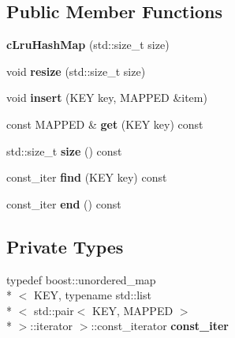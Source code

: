 \subsection*{Public Member Functions}
\begin{DoxyCompactItemize}
\item 
\hypertarget{classresultsDB_1_1cLruHashMap_a529a79f7a33b289760db7771e368aca3}{{\bfseries c\-Lru\-Hash\-Map} (std\-::size\-\_\-t size)}\label{classresultsDB_1_1cLruHashMap_a529a79f7a33b289760db7771e368aca3}

\item 
\hypertarget{classresultsDB_1_1cLruHashMap_a3936bc57867e3eef937226df4c45752e}{void {\bfseries resize} (std\-::size\-\_\-t size)}\label{classresultsDB_1_1cLruHashMap_a3936bc57867e3eef937226df4c45752e}

\item 
\hypertarget{classresultsDB_1_1cLruHashMap_af251ed1c01101b439f637e1ebd0a9113}{void {\bfseries insert} (K\-E\-Y key, M\-A\-P\-P\-E\-D \&item)}\label{classresultsDB_1_1cLruHashMap_af251ed1c01101b439f637e1ebd0a9113}

\item 
\hypertarget{classresultsDB_1_1cLruHashMap_a2f7d334ea70e8ea5de3ad5aa7416bd4a}{const M\-A\-P\-P\-E\-D \& {\bfseries get} (K\-E\-Y key) const }\label{classresultsDB_1_1cLruHashMap_a2f7d334ea70e8ea5de3ad5aa7416bd4a}

\item 
\hypertarget{classresultsDB_1_1cLruHashMap_acf89071b5fd13acbde66a9644c661c59}{std\-::size\-\_\-t {\bfseries size} () const }\label{classresultsDB_1_1cLruHashMap_acf89071b5fd13acbde66a9644c661c59}

\item 
\hypertarget{classresultsDB_1_1cLruHashMap_a5f1cad81321c5af7ba5fbcebcf40de46}{const\-\_\-iter {\bfseries find} (K\-E\-Y key) const }\label{classresultsDB_1_1cLruHashMap_a5f1cad81321c5af7ba5fbcebcf40de46}

\item 
\hypertarget{classresultsDB_1_1cLruHashMap_ad4f8fb406ed151d4f08960565a025131}{const\-\_\-iter {\bfseries end} () const }\label{classresultsDB_1_1cLruHashMap_ad4f8fb406ed151d4f08960565a025131}

\end{DoxyCompactItemize}
\subsection*{Private Types}
\begin{DoxyCompactItemize}
\item 
\hypertarget{classresultsDB_1_1cLruHashMap_aa6825e373718e1cf5718d784ae3f3c9a}{typedef boost\-::unordered\-\_\-map\\*
$<$ K\-E\-Y, typename std\-::list\\*
$<$ std\-::pair$<$ K\-E\-Y, M\-A\-P\-P\-E\-D $>$\\*
 $>$\-::iterator $>$\-::const\-\_\-iterator {\bfseries const\-\_\-iter}}\label{classresultsDB_1_1cLruHashMap_aa6825e373718e1cf5718d784ae3f3c9a}

\end{DoxyCompactItemize}
